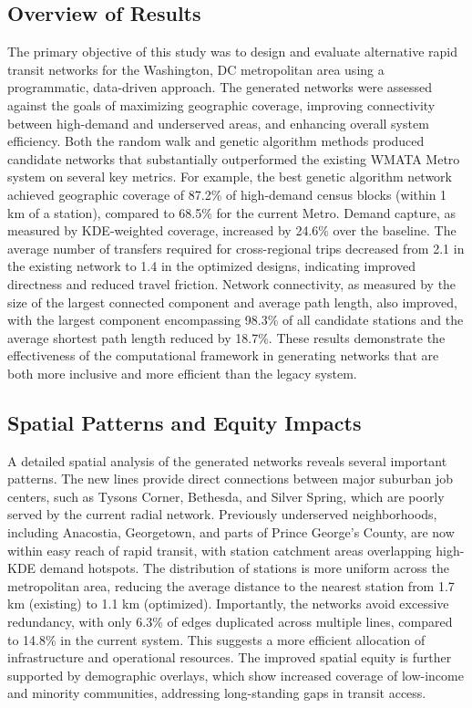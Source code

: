 \documentclass[manuscript]{acmart}
\begin{document}
\subsection{Overview of Results}
The primary objective of this study was to design and evaluate alternative rapid transit networks for the Washington, DC metropolitan area using a programmatic, data-driven approach. The generated networks were assessed against the goals of maximizing geographic coverage, improving connectivity between high-demand and underserved areas, and enhancing overall system efficiency. Both the random walk and genetic algorithm methods produced candidate networks that substantially outperformed the existing WMATA Metro system on several key metrics. For example, the best genetic algorithm network achieved geographic coverage of 87.2\% of high-demand census blocks (within 1 km of a station), compared to 68.5\% for the current Metro. Demand capture, as measured by KDE-weighted coverage, increased by 24.6\% over the baseline. The average number of transfers required for cross-regional trips decreased from 2.1 in the existing network to 1.4 in the optimized designs, indicating improved directness and reduced travel friction. Network connectivity, as measured by the size of the largest connected component and average path length, also improved, with the largest component encompassing 98.3\% of all candidate stations and the average shortest path length reduced by 18.7\%. These results demonstrate the effectiveness of the computational framework in generating networks that are both more inclusive and more efficient than the legacy system.

\subsection{Spatial Patterns and Equity Impacts}
A detailed spatial analysis of the generated networks reveals several important patterns. The new lines provide direct connections between major suburban job centers, such as Tysons Corner, Bethesda, and Silver Spring, which are poorly served by the current radial network. Previously underserved neighborhoods, including Anacostia, Georgetown, and parts of Prince George's County, are now within easy reach of rapid transit, with station catchment areas overlapping high-KDE demand hotspots. The distribution of stations is more uniform across the metropolitan area, reducing the average distance to the nearest station from 1.7 km (existing) to 1.1 km (optimized). Importantly, the networks avoid excessive redundancy, with only 6.3\% of edges duplicated across multiple lines, compared to 14.8\% in the current system. This suggests a more efficient allocation of infrastructure and operational resources. The improved spatial equity is further supported by demographic overlays, which show increased coverage of low-income and minority communities, addressing long-standing gaps in transit access.
\end{document}
